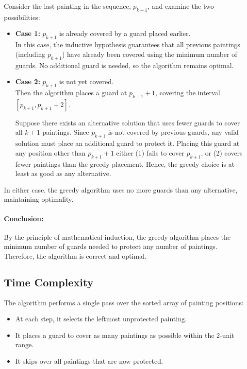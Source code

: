 \documentclass[12pt]{article}
\begin{document}
Consider the last painting in the sequence, \( p_{k+1} \), and examine the two possibilities:

\begin{itemize}
    \item \textbf{Case 1:} \( p_{k+1} \) is already covered by a guard placed earlier. \\
    In this case, the inductive hypothesis guarantees that all previous paintings (including \( p_{k+1} \)) have already been covered using the minimum number of guards. No additional guard is needed, so the algorithm remains optimal.

    \item \textbf{Case 2:} \( p_{k+1} \) is not yet covered. \\
    Then the algorithm places a guard at \( p_{k+1} + 1 \), covering the interval \( [p_{k+1}, p_{k+1} + 2] \). 

    Suppose there exists an alternative solution that uses fewer guards to cover all \( k+1 \) paintings. Since \( p_{k+1} \) is not covered by previous guards, any valid solution must place an additional guard to protect it. Placing this guard at any position other than \( p_{k+1} + 1 \) either (1) fails to cover \( p_{k+1} \), or (2) covers fewer paintings than the greedy placement. Hence, the greedy choice is at least as good as any alternative.
\end{itemize}

In either case, the greedy algorithm uses no more guards than any alternative, maintaining optimality.

\paragraph{Conclusion:}  
By the principle of mathematical induction, the greedy algorithm places the minimum number of guards needed to protect any number of paintings. Therefore, the algorithm is correct and optimal.

\newpage
\subsection*{Time Complexity}

The algorithm performs a single pass over the sorted array of painting positions:

\begin{itemize}
    \item At each step, it selects the leftmost unprotected painting.
    \item It places a guard to cover as many paintings as possible within the 2-unit range.
    \item It skips over all paintings that are now protected.
\end{itemize}
\end{document}
